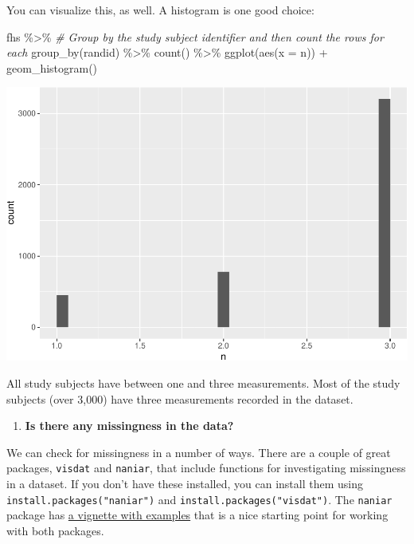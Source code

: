 \documentclass[
]{book}
\newenvironment{Shaded}{\begin{snugshade}}{\end{snugshade}}
\newcommand{\AttributeTok}[1]{\textcolor[rgb]{0.77,0.63,0.00}{#1}}
\newcommand{\CommentTok}[1]{\textcolor[rgb]{0.56,0.35,0.01}{\textit{#1}}}
\newcommand{\FunctionTok}[1]{\textcolor[rgb]{0.00,0.00,0.00}{#1}}
\newcommand{\NormalTok}[1]{#1}
\newcommand{\SpecialCharTok}[1]{\textcolor[rgb]{0.00,0.00,0.00}{#1}}
\providecommand{\tightlist}{%
  \setlength{\itemsep}{0pt}\setlength{\parskip}{0pt}}
\begin{document}
You can visualize this, as well. A histogram is one good choice:

\begin{Shaded}
\begin{Highlighting}[]
\NormalTok{fhs }\SpecialCharTok{\%\textgreater{}\%} 
  \CommentTok{\# Group by the study subject identifier and then count the rows for each}
  \FunctionTok{group\_by}\NormalTok{(randid) }\SpecialCharTok{\%\textgreater{}\%} 
  \FunctionTok{count}\NormalTok{() }\SpecialCharTok{\%\textgreater{}\%} 
  \FunctionTok{ggplot}\NormalTok{(}\FunctionTok{aes}\NormalTok{(}\AttributeTok{x =}\NormalTok{ n)) }\SpecialCharTok{+} 
  \FunctionTok{geom\_histogram}\NormalTok{()}
\end{Highlighting}
\end{Shaded}

\includegraphics{adv_epi_analysis_files/figure-latex/unnamed-chunk-172-1.pdf}

All study subjects have between one and three measurements. Most of the study
subjects (over 3,000) have three measurements recorded in the dataset.

\begin{enumerate}
\def\labelenumi{\arabic{enumi}.}
\setcounter{enumi}{1}
\tightlist
\item
  \textbf{Is there any missingness in the data?}
\end{enumerate}

We can check for missingness in a number of ways. There are a couple of great
packages, \texttt{visdat} and \texttt{naniar}, that include functions for investigating
missingness in a dataset. If you don't have these installed, you can install
them using \texttt{install.packages("naniar")} and \texttt{install.packages("visdat")}. The
\texttt{naniar} package has \href{https://cran.r-project.org/web/packages/naniar/vignettes/getting-started-w-naniar.html}{a vignette with
examples}
that is a nice starting point for working with both packages.
\end{document}
